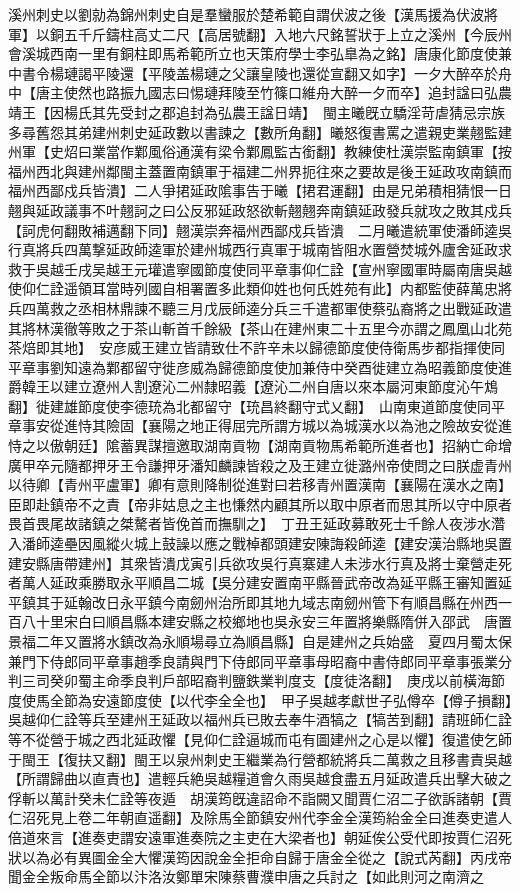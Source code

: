 溪州刺史以劉勍為錦州刺史自是羣蠻服於楚希範自謂伏波之後【漢馬援為伏波將軍】以銅五千斤鑄柱高丈二尺【高居號翻】入地六尺銘誓狀于上立之溪州【今辰州會溪城西南一里有銅柱即馬希範所立也天策府學士李弘臯為之銘】唐康化節度使兼中書令楊璉謁平陵還【平陵盖楊璉之父讓皇陵也還從宣翻又如字】一夕大醉卒於舟中【唐主使然也路振九國志曰惕璉拜陵至竹篠口維舟大醉一夕而卒】追封諡曰弘農靖王【因楊氏其先受封之郡追封為弘農王諡日靖】　閩主曦旣立驕淫苛虐猜忌宗族多尋舊怨其弟建州刺史延政數以書諫之【數所角翻】曦怒復書罵之遣親吏業翹監建州軍【史炤曰業當作鄴風俗通漢有梁令鄴鳳監古銜翻】教練使杜漢崇監南鎮軍【按福州西北與建州鄰閩主蓋置南鎮軍于福建二州界扼往來之要故是後王延政攻南鎮而福州西鄙戍兵皆潰】二人爭捃延政隂事告于曦【捃君運翻】由是兄弟積相猜恨一日翹與延政議事不叶翹訶之曰公反邪延政怒欲斬翹翹奔南鎮延政發兵就攻之敗其戍兵【訶虎何翻敗補邁翻下同】翹漢崇奔福州西鄙戍兵皆潰　二月曦遣統軍使潘師逵吳行真將兵四萬撃延政師逵軍於建州城西行真軍于城南皆阻水置營焚城外廬舍延政求救于吳越壬戌吴越王元瓘遣寧國節度使同平章事仰仁詮【宣州寧國軍時屬南唐吳越使仰仁詮遥領耳當時列國自相署置多此類仰姓也何氏姓苑有此】内都監使薛萬忠將兵四萬救之丞相林鼎諫不聽三月戊辰師逵分兵三千遣都軍使蔡弘裔將之出戰延政遣其將林漢徹等敗之于茶山斬首千餘級【茶山在建州東二十五里今亦謂之鳳凰山北苑茶焙即其地】　安彦威王建立皆請致仕不許辛未以歸德節度使侍衛馬步都指揮使同平章事劉知遠為鄴都留守徙彦威為歸德節度使加兼侍中癸酉徙建立為昭義節度使進爵韓王以建立遼州人割遼沁二州隸昭義【遼沁二州自唐以來本屬河東節度沁午鴆翻】徙建雄節度使李德珫為北都留守【珫昌終翻守式乂翻】　山南東道節度使同平章事安從進恃其險固【襄陽之地正得屈完所謂方城以為城漢水以為池之險故安從進恃之以傲朝廷】隂蓄異謀擅邀取湖南貢物【湖南貢物馬希範所進者也】招納亡命增廣甲卒元隨都押牙王令謙押牙潘知麟諫皆殺之及王建立徙潞州帝使問之曰朕虚青州以待卿【青州平盧軍】卿有意則降制從進對曰若移青州置漢南【襄陽在漢水之南】臣即赴鎮帝不之責【帝非姑息之主也慊然内顧其所以取中原者而思其所以守中原者畏首畏尾故諸鎮之桀驁者皆俛首而撫馴之】　丁丑王延政募敢死士千餘人夜涉水濳入潘師逵壘因風縱火城上鼓譟以應之戰棹都頭建安陳誨殺師逵【建安漢治縣地吳置建安縣唐帶建州】其衆皆潰戊寅引兵欲攻吳行真寨建人未涉水行真及將士棄營走死者萬人延政乘勝取永平順昌二城【吳分建安置南平縣晉武帝改為延平縣王審知置延平鎮其于延翰改日永平鎮今南劒州治所即其地九域志南劒州管下有順昌縣在州西一百八十里宋白曰順昌縣本建安縣之校鄉地也吳永安三年置將樂縣隋併入邵武　唐置景福二年又置將水鎮改為永順場尋立為順昌縣】自是建州之兵始盛　夏四月蜀太保兼門下侍郎同平章事趙季良請與門下侍郎同平章事母昭裔中書侍郎同平章事張業分判三司癸卯蜀主命季良判戶部昭裔判鹽鉄業判度支【度徒洛翻】　庚戌以前橫海節度使馬全節為安遠節度使【以代李全全也】　甲子吳越孝獻世子弘僔卒【僔子損翻】　吳越仰仁詮等兵至建州王延政以福州兵已敗去奉牛酒犒之【犒苦到翻】請班師仁詮等不從營于城之西北延政懼【見仰仁詮逼城而屯有圖建州之心是以懼】復遣使乞師于閩王【復扶又翻】閩王以泉州刺史王繼業為行營都統將兵二萬救之且移書責吳越【所謂歸曲以直責也】遣輕兵絶吳越糧道會久雨吳越食盡五月延政遣兵出擊大破之俘斬以萬計癸未仁詮等夜遁　胡漢筠旣違詔命不詣闕又聞賈仁沼二子欲訴諸朝【賈仁沼死見上卷二年朝直遥翻】及除馬全節鎮安州代李金全漢筠紿金全曰進奏吏遣人倍道來言【進奏吏謂安遠軍進奏院之主吏在大梁者也】朝延俟公受代即按賈仁沼死狀以為必有異圖金全大懼漢筠因說金全拒命自歸于唐金全從之【說式芮翻】丙戌帝聞金全叛命馬全節以汴洛汝鄭單宋陳蔡曹濮申唐之兵討之【如此則河之南濟之